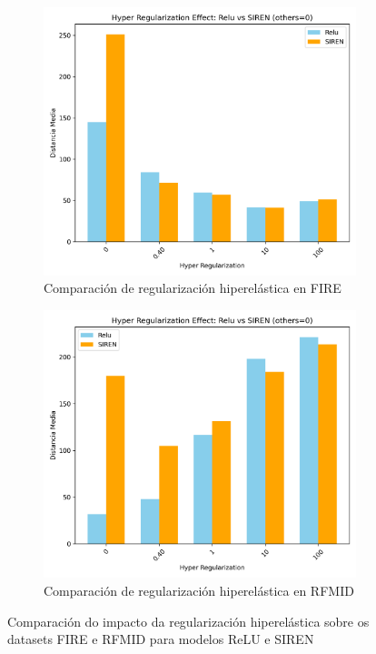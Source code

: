 \begin{figure}[tbp]
    \centering
    \begin{subfigure}[b]{0.48\textwidth}
        \centering
        \includegraphics[width=\textwidth]{imaxes/reg_examples/barplot_hyper_reg_comparison_MLP_vs_SIREN_FIRE.png}
        \caption{Comparación de regularización hiperelástica en FIRE}
        \label{fig:barplot_hyper_reg_comparison_MLP_vs_SIREN_FIRE}
    \end{subfigure}\hfill
    \begin{subfigure}[b]{0.48\textwidth}
        \centering
        \includegraphics[width=\textwidth]{imaxes/reg_examples/barplot_hyper_reg_comparison_MLP_vs_SIREN_RFMID.png}
        \caption{Comparación de regularización hiperelástica en RFMID}
        \label{fig:barplot_hyper_reg_comparison_MLP_vs_SIREN_RFMID}
    \end{subfigure}
    \caption{Comparación do impacto da regularización hiperelástica sobre os datasets FIRE e RFMID para modelos ReLU e SIREN}
    \label{fig:barplot_hyper_reg_comparison}
\end{figure}

